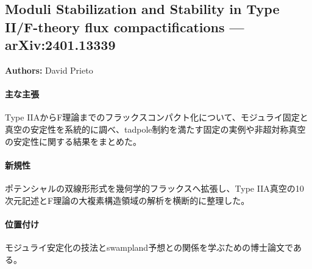 \subsection{Moduli Stabilization and Stability in Type II/F-theory flux compactifications --- arXiv:2401.13339}

\textbf{Authors:} David Prieto

\paragraph{主な主張}
Type IIAからF理論までのフラックスコンパクト化について、モジュライ固定と真空の安定性を系統的に調べ、tadpole制約を満たす固定の実例や非超対称真空の安定性に関する結果をまとめた。 \cite{PrietoRodriguez:2023uru}

\paragraph{新規性}
ポテンシャルの双線形形式を幾何学的フラックスへ拡張し、Type IIA真空の10次元記述とF理論の大複素構造領域の解析を横断的に整理した。

\paragraph{位置付け}
モジュライ安定化の技法とswampland予想との関係を学ぶための博士論文である。
